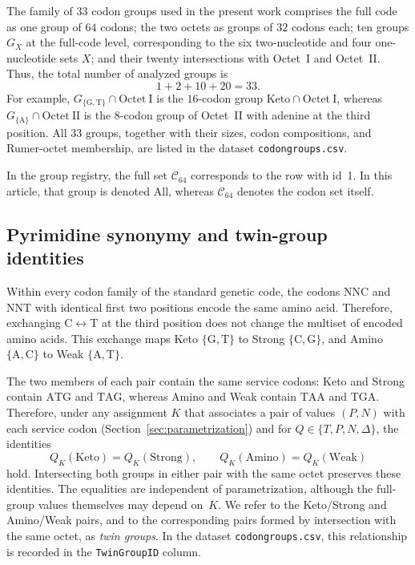 \documentclass[11pt,a4paper]{article}
\renewcommand{\_}{\origunderscore\allowbreak}
\begin{document}
The family of $33$ codon groups used in the present work comprises
the full code as one group of $64$ codons; the two octets as groups
of $32$ codons each; ten groups $G_X$ at the full-code level,
corresponding to the six two-nucleotide and four one-nucleotide
sets $X$; and their twenty intersections with Octet~I and
Octet~II. Thus, the total number of analyzed groups is
\[
1+2+10+20=33.
\]
For example, $G_{\{\mathrm{G},\mathrm{T}\}}\cap
\mathrm{Octet~I}$ is the $16$-codon group
$\mathrm{Keto}\cap\mathrm{Octet~I}$, whereas
$G_{\{\mathrm{A}\}}\cap\mathrm{Octet~II}$ is the $8$-codon group
of Octet~II with adenine at the third position. All $33$ groups,
together with their sizes, codon compositions, and Rumer-octet
membership, are listed in the dataset \texttt{codon\_groups.csv}.

In the group registry, the full set $\mathcal{C}_{64}$ corresponds to
the row with id~1. In this article, that group is denoted
$\mathrm{All}$, whereas $\mathcal{C}_{64}$ denotes the codon set
itself.

\subsection{Pyrimidine synonymy and twin-group identities}
\label{sec:twin-identities}

Within every codon family of the standard genetic code, the codons
$\mathrm{NNC}$ and $\mathrm{NNT}$ with identical first two positions
encode the same amino acid. Therefore, exchanging
$\mathrm{C}\leftrightarrow\mathrm{T}$ at the third position does not
change the multiset of encoded amino acids. This exchange maps Keto
$\{\mathrm{G},\mathrm{T}\}$ to Strong
$\{\mathrm{C},\mathrm{G}\}$, and Amino
$\{\mathrm{A},\mathrm{C}\}$ to Weak
$\{\mathrm{A},\mathrm{T}\}$.

The two members of each pair contain the same service codons: Keto and
Strong contain $\mathrm{ATG}$ and $\mathrm{TAG}$, whereas Amino and
Weak contain $\mathrm{TAA}$ and $\mathrm{TGA}$. Therefore, under any
assignment $K$ that associates a pair of values $(P,N)$ with each
service codon (Section~\ref{sec:parametrization}) and for
$Q\in\{T,P,N,\Delta\}$, the identities
\[
Q_K(\mathrm{Keto})=Q_K(\mathrm{Strong}),\qquad
Q_K(\mathrm{Amino})=Q_K(\mathrm{Weak})
\]
hold. Intersecting both groups in either pair with the same octet
preserves these identities. The equalities are independent of
parametrization, although the full-group values themselves may depend
on~$K$. We refer to the Keto/Strong and Amino/Weak pairs, and to the
corresponding pairs formed by intersection with the same octet, as
\emph{twin groups}. In the dataset \texttt{codon\_groups.csv}, this
relationship is recorded in the \texttt{Twin\_Group\_ID} column.
\end{document}
